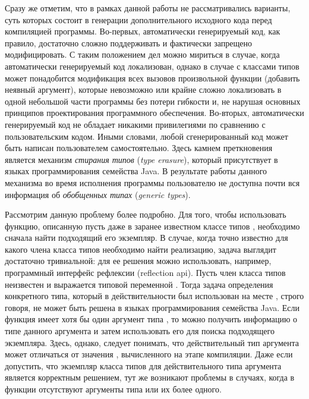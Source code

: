 Сразу же отметим, что в рамках данной работы не рассматривались варианты, суть которых состоит в генерации дополнительного исходного кода перед компиляцией программы. Во-первых, автоматически генерируемый код, как правило, достаточно сложно поддерживать и фактически запрещено модифицировать. С таким положением дел можно мириться в случае, когда автоматически генерируемый код локализован, однако в случае с классами типов может понадобится модификация всех вызовов произвольной функции (добавить неявный аргумент), которые невозможно или крайне сложно локализовать в одной небольшой части программы без потери гибкости и, не нарушая основных принципов проектирования программного обеспечения. Во-вторых, автоматически генерируемый код не обладает никакими привилегиями по сравнению с пользовательским кодом. Иными словами, любой сгенерированный код может быть написан пользователем самостоятельно. Здесь камнем преткновения является механизм \emph{стирания типов} (\emph{type erasure}), который присутствует в языках программирования семейства Java. В результате работы данного механизма во время исполнения программы пользователю не доступна почти вся информация об \emph{обобщенных типах} (\emph{generic types}). 

Рассмотрим данную проблему более подробно. Для того, чтобы использовать функцию, описанную пусть даже в заранее известном классе типов , необходимо сначала найти подходящий его экземпляр. В случае, когда точно известно для какого члена класса типов  необходимо найти реализацию, задача выглядит достаточно тривиальной: для ее решения можно использовать, например, программный интерфейс рефлексии (reflection api). Пусть член класса типов неизвестен и выражается типовой переменной . Тогда задача определения конкретного типа, который в действительности был использован на месте , строго говоря, не может быть решена в языках программирования семейства Java. Если функция имеет хотя бы один аргумент типа , то можно получить информацию о типе данного аргумента и затем использовать его для поиска подходящего экземпляра. Здесь, однако, следует понимать, что действительный тип аргумента может отличаться от значения , вычисленного на этапе компиляции. Даже если допустить, что экземпляр класса типов для действительного типа аргумента является корректным решением, тут же возникают проблемы в случаях, когда в функции отсутствуют аргументы типа  или их более одного. %

